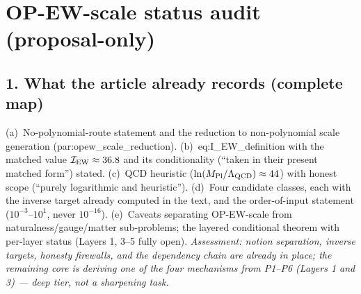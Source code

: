 \section*{OP-EW-scale status audit (proposal-only)}

\subsection*{1. What the article already records (complete map)}
(a)~No-polynomial-route statement and the reduction to
non-polynomial scale generation
(par:opew\_scale\_reduction).
(b)~eq:I\_EW\_definition with the matched value
$\mathcal I_{\rm EW}\approx36.8$ and its conditionality
(``taken in their present matched form'') stated.
(c)~QCD heuristic ($\ln(M_{\rm Pl}/\Lambda_{\rm QCD})\approx44$)
with honest scope (``purely logarithmic and heuristic'').
(d)~Four candidate classes, each with the inverse target already
computed in the text, and the order-of-input statement
($10^{-3}$--$10^{1}$, never $10^{-16}$).
(e)~Caveats separating OP-EW-scale from naturalness/gauge/matter
sub-problems; the layered conditional theorem with per-layer
status (Layers 1, 3--5 fully open).
\emph{Assessment: notion separation, inverse targets, honesty
firewalls, and the dependency chain are already in place; the
remaining core is deriving one of the four mechanisms from
P1--P6 (Layers 1 and 3) --- deep tier, not a sharpening task.}

